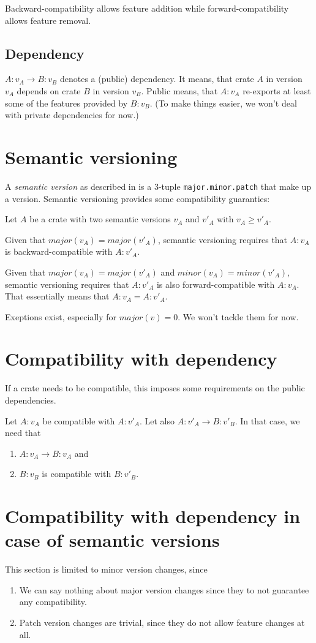 \documentclass{article}
\begin{document}
    Backward-compatibility allows feature addition while forward-compatibility allows feature removal.

    \subsection{Dependency}
    $A:v_A \rightarrow B:v_B$ denotes a (public) dependency. It means, that crate $A$ in version $v_A$ depends on crate $B$ in version $v_B$. Public means, that $A:v_A$ re-exports at least some of the features provided by $B:v_B$. (To make things easier, we won't deal with private dependencies for now.)

    \section{Semantic versioning}
    A \emph{semantic version} as described in \cite{TODO} is a 3-tuple \texttt{major.minor.patch} that make up a version. Semantic versioning provides some compatibility guaranties:

    Let $A$ be a crate with two semantic versions $v_A$ and $v'_A$ with $v_A \geq v'_A$.

    Given that $major(v_A) = major(v'_A)$, semantic versioning requires that $A:v_A$ is backward-compatible with $A:v'_A$.

    Given that $major(v_A) = major(v'_A)$ and $minor(v_A) = minor(v'_A)$, semantic versioning requires that $A:v'_A$ is also forward-compatible with $A:v_A$. That essentially means that $A:v_A = A:v'_A$.

    Exeptions exist, especially for $major(v) = 0$. We won't tackle them for now.

    \section{Compatibility with dependency}
    If a crate needs to be compatible, this imposes some requirements on the public dependencies.

    Let $A:v_A$ be compatible with $A:v'_A$. Let also $A:v'_A \rightarrow B:v'_B$. In that case, we need that
    \begin{enumerate}
        \item $A:v_A \rightarrow B:v_A$ and
        \item $B:v_B$ is compatible with $B:v'_B$.
    \end{enumerate}

    \section{Compatibility with dependency in case of semantic versions}
    \label{sec:Compatibility_with_dependency_in_case_of_semantic_versions}
    This section is limited to minor version changes, since
    \begin{enumerate}
        \item We can say nothing about major version changes since they to not guarantee any compatibility.
        \item Patch version changes are trivial, since they do not allow feature changes at all.
    \end{enumerate}
\end{document}
